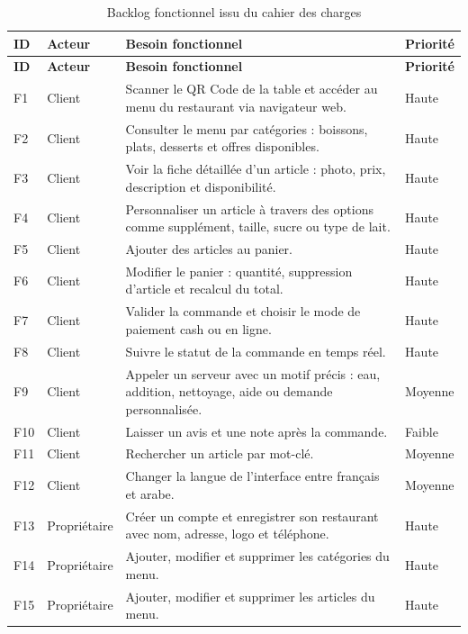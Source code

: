 \documentclass[12pt,a4paper]{report}
\begin{document}
{\small
\begin{longtable}{p{1.2cm}p{2.8cm}p{8.4cm}p{1.8cm}}
    \caption{Backlog fonctionnel issu du cahier des charges}
    \label{tab:product-backlog}\\
    \toprule
    \rowcolor{primary!10}
    \textbf{ID} & \textbf{Acteur} & \textbf{Besoin fonctionnel} & \textbf{Priorité} \\
    \midrule
    \endfirsthead
    \toprule
    \rowcolor{primary!10}
    \textbf{ID} & \textbf{Acteur} & \textbf{Besoin fonctionnel} & \textbf{Priorité} \\
    \midrule
    \endhead
    F1 & Client & Scanner le QR Code de la table et accéder au menu du restaurant via navigateur web. & Haute \\
    F2 & Client & Consulter le menu par catégories : boissons, plats, desserts et offres disponibles. & Haute \\
    F3 & Client & Voir la fiche détaillée d'un article : photo, prix, description et disponibilité. & Haute \\
    F4 & Client & Personnaliser un article à travers des options comme supplément, taille, sucre ou type de lait. & Haute \\
    F5 & Client & Ajouter des articles au panier. & Haute \\
    F6 & Client & Modifier le panier : quantité, suppression d'article et recalcul du total. & Haute \\
    F7 & Client & Valider la commande et choisir le mode de paiement cash ou en ligne. & Haute \\
    F8 & Client & Suivre le statut de la commande en temps réel. & Haute \\
    F9 & Client & Appeler un serveur avec un motif précis : eau, addition, nettoyage, aide ou demande personnalisée. & Moyenne \\
    F10 & Client & Laisser un avis et une note après la commande. & Faible \\
    F11 & Client & Rechercher un article par mot-clé. & Moyenne \\
    F12 & Client & Changer la langue de l'interface entre français et arabe. & Moyenne \\
    F13 & Propriétaire & Créer un compte et enregistrer son restaurant avec nom, adresse, logo et téléphone. & Haute \\
    F14 & Propriétaire & Ajouter, modifier et supprimer les catégories du menu. & Haute \\
    F15 & Propriétaire & Ajouter, modifier et supprimer les articles du menu. & Haute \\

\end{longtable}}
\end{document}
